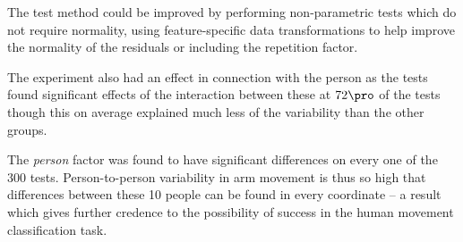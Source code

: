 \documentclass[11pt,fleqn]{article}
\begin{document}
The test method could be improved by performing non-parametric tests which do not require normality, using feature-specific data transformations to help improve the normality of the residuals or including the repetition factor.

The experiment also had an effect in connection  with the person as the tests found significant effects of the interaction between these at \(72\pro\) of the tests though this on average explained much less of the variability than the other groups.

The \textit{person} factor was found to have significant differences on every one of the 300 tests. Person-to-person variability in arm movement is thus so high that differences between these 10 people can be found in every coordinate -- a result which gives further credence to the possibility of success in the human movement classification task.






%
%
\end{document}
